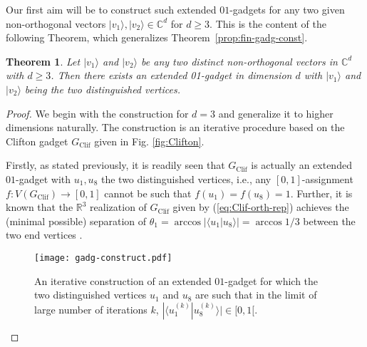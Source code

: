 \documentclass[twocolumn, a4paper, superscriptaddress,nofootinbib, accepted=2020-08-07, hyperref]{quantumarticle}
\newtheorem{theorem}{Theorem}
\begin{document}
Our first aim will be to construct such extended $01$-gadgets for any two given non-orthogonal vectors $|v_1 \rangle, |v_2 \rangle \in \mathbb{C}^d$ for $d \geq 3$. This is the content of the following Theorem, which generalizes Theorem~\ref{prop:fin-gadg-const}.

\begin{theorem}
	\label{prop:101-gadg-const}
	Let $|v_1 \rangle$ and $|v_2 \rangle$ be any two distinct non-orthogonal vectors in $\mathbb{C}^d$ with $d \geq 3$. Then there exists an extended 01-gadget in dimension $d$ with $|v_1 \rangle$ and $|v_2 \rangle$ being the two distinguished vertices.
\end{theorem}
\begin{proof}
	We begin with the construction for $d=3$ and generalize it to higher dimensions naturally. The construction is an iterative procedure based on the Clifton gadget $G_{\text{Clif}}$ given in Fig. \ref{fig:Clifton}.
	
Firstly, as stated previously, it is readily seen that $G_{\text{Clif}}$ is actually an extended $01$-gadget with $u_1, u_8$ the two distinguished vertices, i.e., any $[0,1]$-assignment $f : V(G_{\text{Clif}}) \rightarrow [0,1]$ cannot be such that $f(u_1)=f(u_8)=1$. 
Further, it is known that the $\mathbb{R}^3$ realization of $G_{\text{Clif}}$ given by (\ref{eq:Clif-orth-rep})  achieves the (minimal possible) separation of $\theta_1 = \arccos{|\langle u_1 | u_8 \rangle|} = \arccos{1/3}$ between the two end vertices \cite{Stanford}. 

\begin{figure}
	\centerline{\texttt{[image: gadg-construct.pdf]}}
	\caption{An iterative construction of an extended $01$-gadget for which the two distinguished vertices $u_1$ and $u_8$ are such that in the limit of large number of iterations $k$, $ |\langle u_1^{(k)} | u_8^{(k)}\rangle|\in [0,1[$.}
	\label{fig:Gad-construct}
\end{figure} 


\end{proof}
\end{document}

